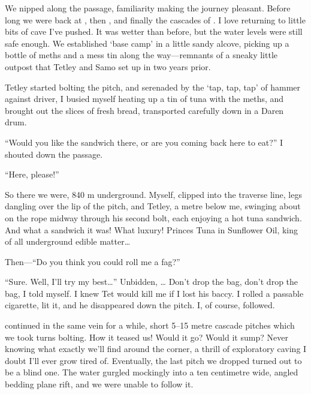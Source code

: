 
We nipped along the passage, familiarity making the journey pleasant.
Before long we were back at , then , and finally
the cascades of . I love returning to little bits of
cave I've pushed. It was wetter than before, but the water levels were
still safe enough. We established `base camp' in a little sandy alcove,
picking up a bottle of meths and a mess tin along the way---remnants of
a sneaky little outpost that Tetley and Samo set up in  two
years prior.

Tetley started bolting the pitch, and serenaded by the `tap, tap, tap'
of hammer against driver, I busied myself heating up a tin of tuna with
the meths, and brought out the slices of fresh bread, transported
carefully down in a Daren drum.

``Would you like the sandwich there, or are you coming back here to
eat?'' I shouted down the passage.

``Here, please!''

So there we were, 840 m underground. Myself, clipped into the traverse
line, legs dangling over the lip of the pitch, and Tetley, a metre below
me, swinging about on the rope midway through his second bolt, each
enjoying a hot tuna sandwich. And what a sandwich it was! What luxury!
Princes Tuna in Sunflower Oil, king of all underground edible
matter\ldots{}

Then---``Do you think you could roll me a fag?''

``Sure. Well, I'll try my best\ldots{}'' Unbidden, \ldots{} Don't drop the bag, don't drop the bag, I told
myself. I knew Tet would kill me if I lost his baccy. I rolled a
passable cigarette, lit it, and he disappeared down the pitch. I, of
course, followed.

 continued in the same vein for a while, short 5--15
metre cascade pitches which we took turns bolting. How it teased us!
Would it go? Would it sump? Never knowing what exactly we'll find around
the corner, a thrill of exploratory caving I doubt I'll ever grow tired
of. Eventually, the last pitch we dropped turned out to be a blind one.
The water gurgled mockingly into a ten centimetre wide, angled bedding
plane rift, and we were unable to follow it.

